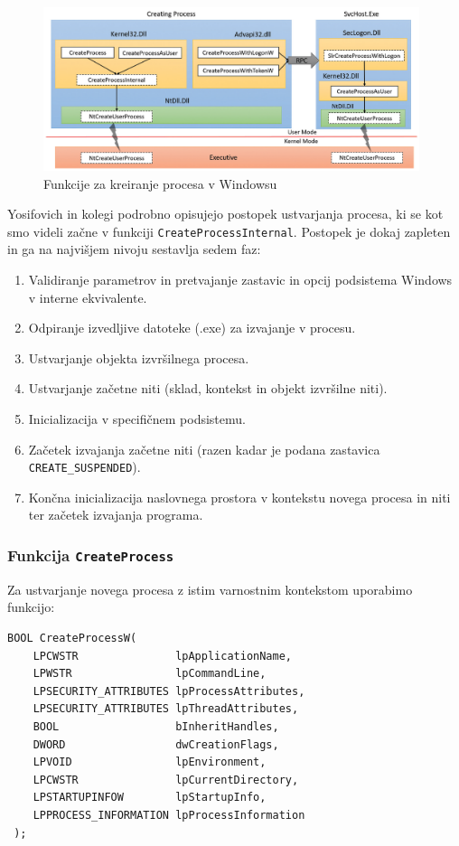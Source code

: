 \documentclass[a4paper,12pt,openright]{book}
\begin{document}
\begin{figure}[h!]
	\begin{center}
		\includegraphics[width=0.98\textwidth]{images/windows_createprocess_functions.png}
	\end{center}
	\caption{Funkcije za kreiranje procesa v Windowsu \cite{Yosifovich_Russinovich_Solomon_Ionescu_2017}}
	\label{fig:windows_createprocess_functions}
\end{figure}

Yosifovich in kolegi \cite{Yosifovich_Russinovich_Solomon_Ionescu_2017} podrobno opisujejo postopek ustvarjanja procesa, ki se kot smo videli začne v funkciji \texttt{CreateProcessInternal}.
Postopek je dokaj zapleten in ga na najvišjem nivoju sestavlja sedem faz:
\begin{enumerate}
	\item Validiranje parametrov in pretvajanje zastavic in opcij podsistema Windows v interne ekvivalente.
	\item Odpiranje izvedljive datoteke (.exe) za izvajanje v procesu.
	\item Ustvarjanje objekta izvršilnega procesa.
	\item Ustvarjanje začetne niti (sklad, kontekst in objekt izvršilne niti).
	\item Inicializacija v specifičnem podsistemu.
	\item Začetek izvajanja začetne niti (razen kadar je podana zastavica \texttt{CREATE\-\_SUSPENDED}).
	\item Končna inicializacija naslovnega prostora v kontekstu novega procesa in niti ter začetek izvajanja programa.
\end{enumerate}

\subsubsection{Funkcija \texttt{CreateProcess}}

Za ustvarjanje novega procesa z istim varnostnim kontekstom uporabimo funkcijo:
\begin{lstlisting}[style=func]
 BOOL CreateProcessW(
	LPCWSTR               lpApplicationName,
	LPWSTR                lpCommandLine,
	LPSECURITY_ATTRIBUTES lpProcessAttributes,
	LPSECURITY_ATTRIBUTES lpThreadAttributes,
	BOOL                  bInheritHandles,
	DWORD                 dwCreationFlags,
	LPVOID                lpEnvironment,
	LPCWSTR               lpCurrentDirectory,
	LPSTARTUPINFOW        lpStartupInfo,
	LPPROCESS_INFORMATION lpProcessInformation
 );
\end{lstlisting}
\end{document}
